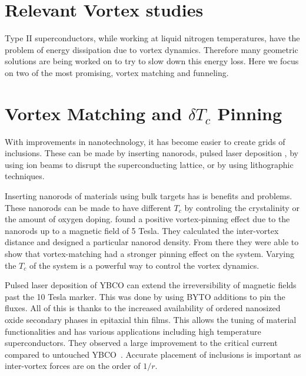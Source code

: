 \section{Relevant Vortex studies}

Type II superconductors, while working at liquid nitrogen temperatures, have the problem of energy dissipation due to vortex dynamics. Therefore many geometric solutions are being worked on to try to slow down this energy loss. Here we focus on two of the most promising, vortex matching and funneling.

\section{Vortex Matching and $\delta T_c$ Pinning}
With improvements in nanotechnology, it has become easier to create grids of inclusions. These can be made by inserting nanorods, pulsed laser deposition , by using ion beams to disrupt the superconducting lattice, or by using lithographic techniques.

Inserting nanorods of materials using bulk targets has is benefits and problems. These nanorods can be made to have different $T_c$ by controling the crystalinity or the amount of oxygen doping. \cite{Horii15} found a positive vortex-pinning effect due to the nanorods up to a magnetic field of 5 Tesla. They calculated the inter-vortex distance and designed a particular nanorod density. From there they were able to show that vortex-matching had a stronger pinning effect on the system. Varying the $T_c$ of the system is a powerful way to control the vortex dynamics.

Pulsed laser deposition of YBCO can extend the irreversibility of magnetic fields past the 10 Tesla marker. This was done by using BYTO additions to pin the fluxes. All of this is thanks to the increased availability of ordered nanosized oxide secondary phases in epitaxial thin films. This allows the tuning of material functionalities and has various applications including high temperature superconductors. They observed a large improvement to the critical current compared to untouched YBCO~\cite{Rizzo16}. Accurate placement of inclusions is important as inter-vortex forces are on the order of $1/r$.      

